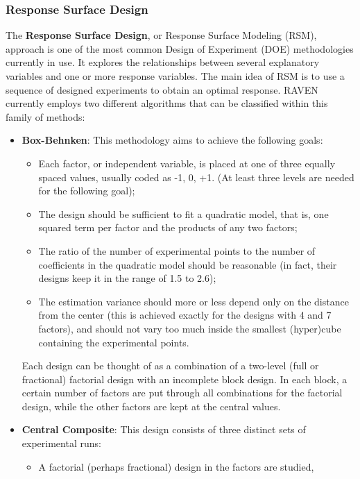 \subsubsection{Response Surface Design}
\label{subsubsubsec:RespSurfDOE}
The \textbf{Response Surface Design}, or Response Surface Modeling (RSM),
approach is one of the most common Design of Experiment (DOE) methodologies
currently in use.
%
It explores the relationships between several explanatory variables and one or
more response variables.
%
The main idea of RSM is to use a sequence of designed experiments to obtain an
optimal response.
%
RAVEN currently employs two different algorithms that can be classified within
this family of methods:
\begin{itemize}
 \item \textbf{Box-Behnken}: This methodology aims to achieve the following
  goals:
  \begin{itemize}
    \item Each factor, or independent variable, is placed at one of three
      equally spaced values, usually coded as -1, 0, +1. (At least three levels
      are needed for the following goal);
    \item The design should be sufficient to fit a quadratic model, that is, one
      squared term per factor and the products of any two factors;
    \item The ratio of the number of experimental points to the number of
      coefficients in the quadratic model should be reasonable (in fact, their
      designs keep it in the range of 1.5 to 2.6);
    \item The estimation variance should more or less depend only on the
      distance from the center (this is achieved exactly for the designs with 4
      and 7 factors), and should not vary too much inside the smallest
      (hyper)cube containing the experimental points.
  \end{itemize}
  Each design can be thought of as a combination of a two-level (full or
  fractional) factorial design with an incomplete block design.
  In each block, a certain number of factors are put through all combinations
  for the factorial design, while the other factors are kept at the central
  values.
 \item \textbf{Central Composite}: This design consists of three distinct sets
  of experimental runs:
  \begin{itemize}
    \item A factorial (perhaps fractional) design in the factors are studied,

\end{itemize}
\end{itemize}
